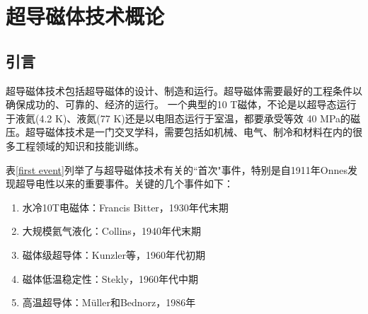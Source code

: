 \chapter{超导磁体技术概论}
\section{引言}
超导磁体技术包括超导磁体的设计、制造和运行。超导磁体需要最好的工程条件以确保成功的、可靠的、经济的运行。
一个典型的10 T磁体，不论是以超导态运行于液氦(4.2 K)、液氮(77 K)还是以电阻态运行于室温，都要承受等效
40 MPa的磁压。超导磁体技术是一门交叉学科，需要包括如机械、电气、制冷和材料在内的很多工程领域的知识和技能训练。

表\ref{first event}列举了与超导磁体技术有关的``首次"事件，特别是自1911年Onnes发现超导电性以来的重要事件。关键的几个事件如下：
\begin{enumerate}
  \item 水冷10T电磁体：Francis Bitter，1930年代末期
  \item 大规模氦气液化：Collins，1940年代末期
  \item 磁体级超导体：Kunzler等，1960年代初期
  \item 磁体低温稳定性：Stekly，1960年代中期
  \item 高温超导体：Müller和Bednorz，1986年
\end{enumerate}

